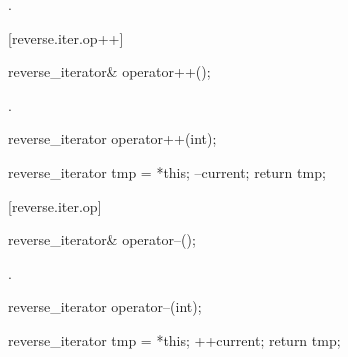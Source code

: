 \begin{itemdescr}
\pnum
\returns {}.
\end{itemdescr}

[reverse.iter.op++]{}

%
\begin{itemdecl}
reverse_iterator& operator++();
\end{itemdecl}

\begin{itemdescr}
\pnum
\effects
{}

\pnum
\returns
{}.
\end{itemdescr}

%
%
\begin{itemdecl}
reverse_iterator operator++(int);
\end{itemdecl}

\begin{itemdescr}
\pnum
\effects
\begin{codeblock}
reverse_iterator tmp = *this;
--current;
return tmp;
\end{codeblock}
\end{itemdescr}

[reverse.iter.op\dcr]{}

%
\begin{itemdecl}
reverse_iterator& operator--();
\end{itemdecl}

\begin{itemdescr}
\pnum
\effects
{}

\pnum
\returns
{}.
\end{itemdescr}

%
%
\begin{itemdecl}
reverse_iterator operator--(int);
\end{itemdecl}

\begin{itemdescr}
\pnum
\effects
\begin{codeblock}
reverse_iterator tmp = *this;
++current;
return tmp;
\end{codeblock}
\end{itemdescr}


